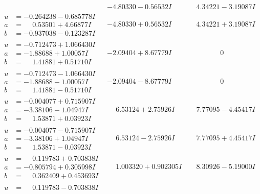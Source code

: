 \documentclass[1p]{elsarticle_modified}
\theoremstyle{definition}
\begin{document}
$$\begin{array}{c|c|c}
 & -4.80330 - 0.56532 I & \phantom{-}4.34221 - 3.19087 I \\ \hline\begin{aligned}
u &= -0.264238 - 0.685778 I \\
a &= \phantom{-}0.53501 + 4.66877 I \\
b &= -0.937038 - 0.123287 I\end{aligned}
 & -4.80330 + 0.56532 I & \phantom{-}4.34221 + 3.19087 I \\ \hline\begin{aligned}
u &= -0.712473 + 1.066430 I \\
a &= -1.88688 + 1.00057 I \\
b &= \phantom{-}1.41881 + 0.51710 I\end{aligned}
 & -2.09404 + 8.67779 I & \phantom{-0.000000 } 0 \\ \hline\begin{aligned}
u &= -0.712473 - 1.066430 I \\
a &= -1.88688 - 1.00057 I \\
b &= \phantom{-}1.41881 - 0.51710 I\end{aligned}
 & -2.09404 - 8.67779 I & \phantom{-0.000000 } 0 \\ \hline\begin{aligned}
u &= -0.004077 + 0.715907 I \\
a &= -3.38106 - 1.04947 I \\
b &= \phantom{-}1.53871 + 0.03923 I\end{aligned}
 & \phantom{-}6.53124 + 2.75926 I & \phantom{-}7.77095 - 4.45417 I \\ \hline\begin{aligned}
u &= -0.004077 - 0.715907 I \\
a &= -3.38106 + 1.04947 I \\
b &= \phantom{-}1.53871 - 0.03923 I\end{aligned}
 & \phantom{-}6.53124 - 2.75926 I & \phantom{-}7.77095 + 4.45417 I \\ \hline\begin{aligned}
u &= \phantom{-}0.119783 + 0.703838 I \\
a &= -0.805794 + 0.305998 I \\
b &= \phantom{-}0.362409 + 0.453693 I\end{aligned}
 & \phantom{-}1.003320 + 0.902305 I & \phantom{-}8.30926 - 5.19000 I \\ \hline\begin{aligned}
u &= \phantom{-}0.119783 - 0.703838 I \\

\end{aligned}
\end{array}$$
\end{document}
